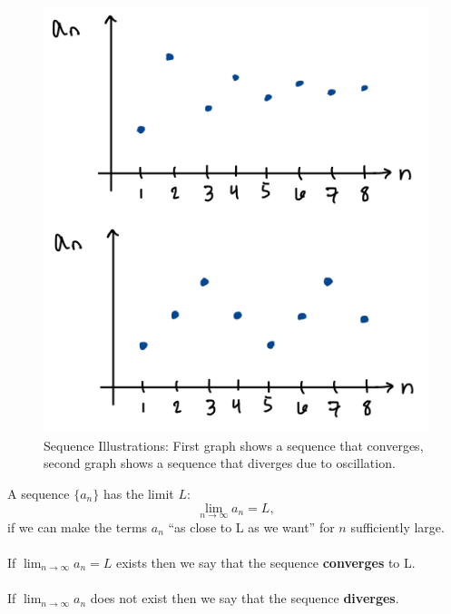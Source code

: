 \documentclass[10pt]{article}
\begin{document}
\begin{figure}
\begin{center}
\includegraphics[width=.9\textwidth]{Ch8s1-conv-div.png}
\caption{Sequence Illustrations: First graph shows a sequence that converges, second graph shows a sequence that diverges due to oscillation.}
%
\end{center}
\end{figure}

\hspace*{.2in}
A sequence \(\lbrace a_n\rbrace\) has the limit \(L\):
\[
\lim_{n\rightarrow\infty} a_n = L,
\]
if we can make the terms \(a_n\) ``as close to L as we want'' for \(n\) sufficiently large.\\~\\
If \(\lim_{n\rightarrow\infty} a_n = L\) exists then we say that the sequence \textbf{converges} to L.\\~\\
If \(\lim_{n\rightarrow\infty} a_n \) does not exist then we say that the sequence \textbf{diverges}.\\~\\
\end{document}
